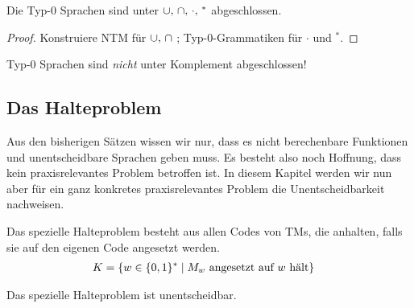 {\begin{Satz}[name={[Abgeschlossenheit von Typ-0 Sprachen]}]\label{satz:Typ-0-abgeschl}
	Die Typ-0 Sprachen sind unter $\thinmuskip=6mu\cup,\cap,\cdot,{}^*$ abgeschlossen.
\end{Satz}
\begin{proof}
	Konstruiere \ac{NTM} für $\thinmuskip=6mu\cup,\cap$ ; Typ-0-Grammatiken für $\cdot$ und $^*$.
\end{proof}

\begin{Bem}
	Typ-0 Sprachen sind \emph{nicht} unter Komplement abgeschlossen!
\end{Bem}
}


\subsection{Das Halteproblem}
Aus den bisherigen Sätzen wissen wir nur, 
dass es nicht berechenbare Funktionen und unentscheidbare Sprachen geben muss.
Es besteht also noch Hoffnung, dass kein praxisrelevantes Problem betroffen ist.
In diesem Kapitel werden wir nun aber für ein ganz konkretes praxisrelevantes Problem die Unentscheidbarkeit nachweisen.


\begin{Def}[name={[Spezielles Halteproblem]}]
  Das spezielle Halteproblem besteht aus allen Codes von \ac{TM}s, die
  anhalten, falls sie auf den eigenen Code angesetzt werden.
  \begin{align*}
    K &= \{ w \in \{0,1\}^* \mid M_w \text{ angesetzt auf }w\text{
        hält} \}\qedhere
  \end{align*}
\end{Def}
\begin{Satz}\label{satz:speziellesHalteproblem}
  Das spezielle Halteproblem ist unentscheidbar.
\end{Satz}

